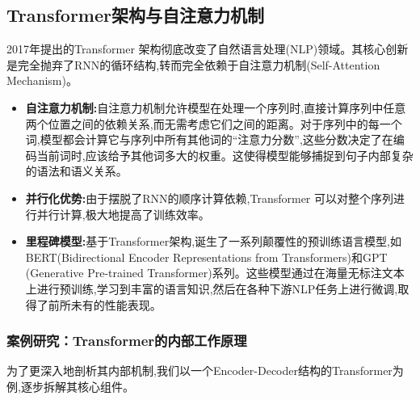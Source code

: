 \subsection{Transformer架构与自注意力机制}
\label{ssec:transformer}
2017年提出的Transformer 架构彻底改变了自然语言处理(NLP)领域。其核心创新是完全抛弃了RNN的循环结构,转而完全依赖于自注意力机制(Self-Attention Mechanism)。
\begin{itemize}
    \item \textbf{自注意力机制:}自注意力机制允许模型在处理一个序列时,直接计算序列中任意两个位置之间的依赖关系,而无需考虑它们之间的距离。对于序列中的每一个词,模型都会计算它与序列中所有其他词的“注意力分数”,这些分数决定了在编码当前词时,应该给予其他词多大的权重。这使得模型能够捕捉到句子内部复杂的语法和语义关系。
    \item \textbf{并行化优势:}由于摆脱了RNN的顺序计算依赖,Transformer 可以对整个序列进行并行计算,极大地提高了训练效率。
    \item \textbf{里程碑模型:}基于Transformer架构,诞生了一系列颠覆性的预训练语言模型,如BERT(Bidirectional Encoder Representations from Transformers)和GPT (Generative Pre-trained Transformer)系列。这些模型通过在海量无标注文本上进行预训练,学习到丰富的语言知识,然后在各种下游NLP任务上进行微调,取得了前所未有的性能表现。
\end{itemize}

\subsubsection*{案例研究：Transformer的内部工作原理}
\label{sssec:transformer_case_study}
为了更深入地剖析其内部机制,我们以一个Encoder-Decoder结构的Transformer为例,逐步拆解其核心组件。


